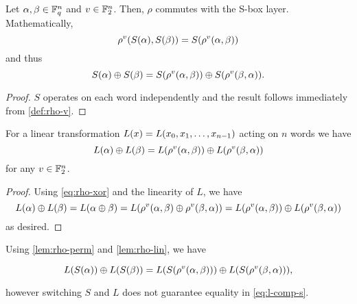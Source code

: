 \documentclass[twoside]{article}
\begin{document}
\begin{lemma}
    \label{lem:rho-perm}
    Let \(\alpha, \beta \in \mathbb F_q^n\) and \(v \in \mathbb F_2^n\). Then, \(\rho\)
    commutes with the S-box layer. Mathematically,
    \begin{equation}
        \rho^v(S(\alpha), S(\beta)) = S(\rho^v(\alpha, \beta))
        \label{eq:rho-s-invariant}
    \end{equation}
    and thus
    \begin{equation}
        S(\alpha) \oplus S(\beta) = S(\rho^v(\alpha, \beta)) \oplus S(\rho^v(\beta, \alpha)).
    \end{equation}
\end{lemma}
\begin{proof}
    \(S\) operates on each word independently and the result follows immediately
    from \autoref{def:rho-v}.
\end{proof}

\begin{lemma}
    \label{lem:rho-lin}
    For a linear transformation \(L(x) = L(x_0, x_1, \ldots, x_{n -
    1})\) acting on \(n\) words we have
    \begin{equation}
        L(\alpha) \oplus L(\beta) = L(\rho^v(\alpha, \beta)) \oplus L(\rho^v(\beta, \alpha))
    \end{equation}
    for any \(v \in \mathbb F_2^n\).
\end{lemma}
\begin{proof}
    Using \eqref{eq:rho-xor} and the linearity of \(L\), we have
    \begin{equation}
        L(\alpha) \oplus L(\beta) = L(\alpha \oplus \beta) = L(\rho^v(\alpha, \beta) \oplus \rho^v(\beta, \alpha)) = L(\rho^v(\alpha, \beta)) \oplus L(\rho^v(\beta, \alpha))
    \end{equation}
    as desired.
\end{proof}

Using \autoref{lem:rho-perm} and \autoref{lem:rho-lin}, we have

\begin{equation}
    L(S(\alpha)) \oplus L(S(\beta)) = L(S(\rho^v(\alpha, \beta))) \oplus L(S(\rho^v(\beta, \alpha))),
    \label{eq:l-comp-s}
\end{equation}

however switching \(S\) and \(L\) does not guarantee equality in
\eqref{eq:l-comp-s}.
\end{document}
